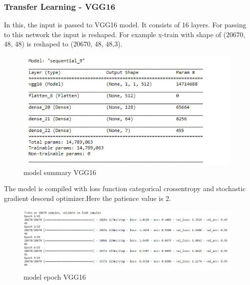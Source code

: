 \subsubsection{Transfer Learning - VGG16}
 In this, the input is passed to VGG16 model. It consists of 16 layers. For passing to this network the input is reshaped. For example x-train with shape of (20670, 48, 48) is reshaped to (20670, 48, 48,3).
\begin{figure}[h]
\label{ss}
\centering
\includegraphics[width= 15cm]{vgg16sum.PNG}
\caption{model summary VGG16}
\end{figure} 
The model is compiled with loss function categorical crossentropy and stochastic gradient descend optimizer.Here the patience value is 2.
\begin{figure}[h]
\label{ss}
\centering
\includegraphics[width= 18cm]{vgg16epoch.PNG}
\caption{model epoch VGG16}
\end{figure}



